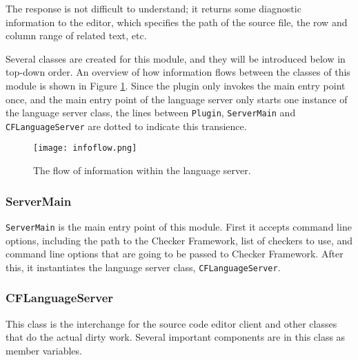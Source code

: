 \documentclass{article}
\begin{document}
The response is not difficult to understand; it returns some diagnostic
information to the editor, which specifies the path of the source file, the row
and column range of related text, etc.

Several classes are created for this module, and they will be introduced below
in top-down order. An overview of how information flows between the classes of
this module is shown in Figure \ref{fig:ls-modules}. Since the plugin only
invokes the main entry point once, and the main entry point of the language
server only starts one instance of the language server class, the lines between
\verb|Plugin|, \verb|ServerMain| and \verb|CFLanguageServer| are dotted to
indicate this transience.

\begin{figure}
\centering
\texttt{[image: infoflow.png]}
\caption{The flow of information within the language server.}
\label{fig:ls-modules}
\end{figure}

\subsubsection{ServerMain}

\verb|ServerMain| is the main entry point of this module. First it accepts
command line options, including the path to the Checker Framework, list of
checkers to use, and command line options that are going to be passed to Checker
Framework. After this, it instantiates the language server class,
\verb|CFLanguageServer|.

\subsubsection{CFLanguageServer}

This class is the interchange for the source code editor client and other
classes that do the actual dirty work. Several important components are in this
class as member variables.
\end{document}
